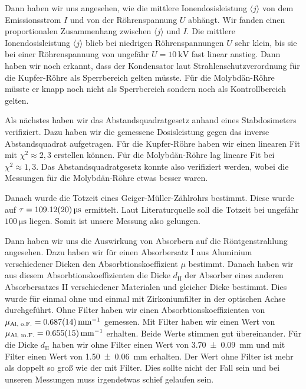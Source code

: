 \documentclass{article}
\begin{document}
Dann haben wir uns angesehen, wie die mittlere Ionendosisleistung $\langle j \rangle$ von dem Emissionsstrom $I$ und von der Röhrenspannung $U$ abhängt.
Wir fanden einen proportionalen Zusammenhang zwischen $\langle j \rangle$ und $I$.
Die mittlere Ionendosisleistung $\langle j \rangle$ blieb bei niedrigen Röhrenspannungen $U$ sehr klein, bis sie bei einer Röhrenspannung von ungefähr $U = \SI{10}{\kilo\volt}$ fast linear anstieg.
Dann haben wir noch erkannt, dass der Kondensator laut Strahlenschutzverordnung für die Kupfer-Röhre als Sperrbereich gelten müsste. Für die Molybdän-Röhre müsste er knapp noch nicht als Sperrbereich sondern noch als Kontrollbereich gelten.

Als nächstes haben wir das Abstandsquadratgesetz anhand eines Stabdosimeters verifiziert.
Dazu haben wir die gemessene Dosisleistung gegen das inverse Abstandsquadrat aufgetragen.
Für die Kupfer-Röhre haben wir einen linearen Fit mit $\chi^2 \approx 2,3$ erstellen können.
Für die Molybdän-Röhre lag lineare Fit bei $\chi^2 \approx 1,3$.
Das Abstandsquadratgesetz konnte also verifiziert werden, wobei die Messungen für die Molybdän-Röhre etwas besser waren.

Danach wurde die Totzeit eines Geiger-Müller-Zählrohrs bestimmt.
Diese wurde auf $\tau = \SI{109,12 \pm 0,20}{\micro\second}$ ermittelt.
Laut Literaturquelle \cite{Arbeitsbereiche} soll die Totzeit bei ungefähr $\SI{100}{\micro\second}$ liegen.
Somit ist unsere Messung also gelungen.

Dann haben wir uns die Auswirkung von Absorbern auf die Röntgenstrahlung angesehen.
Dazu haben wir für einen Absorbersatz I aus Aluminium verschiedener Dicken den Absorbtionskoeffizient $\mu$ bestimmt.
Danach haben wir aus diesem Absorbtionskoeffizienten die Dicke $d_\text{II}$ der Absorber eines anderen Absorbersatzes II verschiedener Materialen und gleicher Dicke bestimmt.
Dies wurde für einmal ohne und einmal mit Zirkoniumfilter in der optischen Achse durchgeführt.
Ohne Filter haben wir einen Absorbtionskoeffizienten von $\mu_\text{Al, o.F.} = \SI{0,687 \pm 0,014}{\per \milli\meter}$ gemessen. 
Mit Filter haben wir einen Wert von $\mu_\text{Al, m.F.} = \SI{0,655 \pm 0,015}{\per \milli\meter}$ erhalten. 
Beide Werte stimmen gut übereinander.
Für die Dicke $d_\text{II}$ haben wir ohne Filter einen Wert von \SI{3,70 \pm 0,09}{\milli\meter} und mit Filter einen Wert von \SI{1,50 \pm 0,06}{\milli\meter} erhalten.
Der Wert ohne Filter ist mehr als doppelt so groß wie der mit Filter.
Dies sollte nicht der Fall sein und bei unseren Messungen muss irgendetwas schief gelaufen sein.
\end{document}
